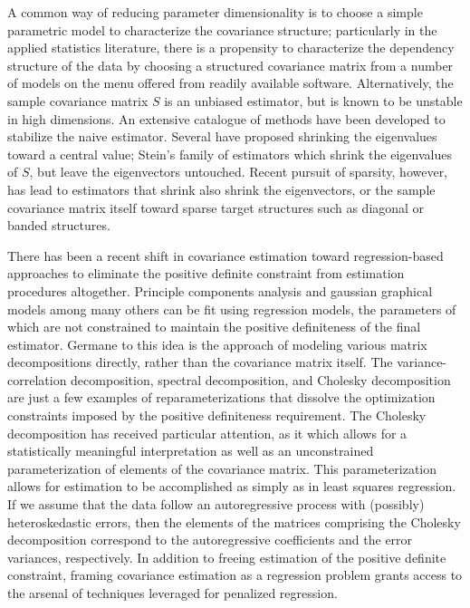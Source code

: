 \bigskip

A common way of reducing parameter dimensionality is to choose a simple parametric model to characterize the covariance structure; particularly in the applied statistics literature, there is a propensity to characterize the dependency structure of the data by choosing a structured covariance matrix from a number of models on the menu offered from readily available software. Alternatively, the sample covariance matrix $S$ is an unbiased estimator, but is known to be unstable in high dimensions. An extensive catalogue of methods have been developed to stabilize the naive estimator. Several have proposed shrinking the eigenvalues toward a central value; Stein's family of estimators which shrink the eigenvalues of $S$, but leave the eigenvectors untouched. Recent pursuit of sparsity, however, has lead to estimators that shrink also shrink the eigenvectors, or the sample covariance matrix itself toward sparse target structures such as diagonal or banded structures. 


\bigskip

There has been a recent shift in covariance estimation toward regression-based approaches to eliminate the positive definite constraint from estimation procedures altogether. Principle components analysis and gaussian graphical models among many others can be fit using regression models, the parameters of which are not constrained to maintain the positive definiteness of the final estimator. Germane to this idea is the approach of modeling various matrix decompositions directly, rather than the covariance matrix itself. The variance-correlation decomposition, spectral decomposition, and Cholesky decomposition are just a few examples of reparameterizations that dissolve the optimization constraints imposed by the positive definiteness requirement. The Cholesky decomposition has received particular attention, as it which allows for a statistically meaningful interpretation as well as an unconstrained parameterization of elements of the covariance matrix. This parameterization allows for estimation to be accomplished as simply as in least squares regression. If we assume that the data follow an autoregressive process with (possibly) heteroskedastic errors, then the elements of the matrices comprising the Cholesky decomposition correspond to the autoregressive coefficients and the error variances, respectively. In addition to freeing estimation of the positive definite constraint, framing covariance estimation as a regression problem grants access to the arsenal of techniques leveraged for penalized regression.

